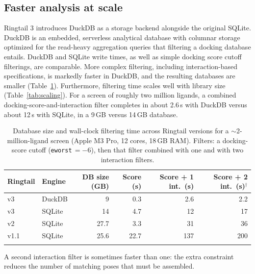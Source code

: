 \documentclass[unnumsec,webpdf,contemporary,large]{oup-authoring-template}
\begin{document}
\subsection{Faster analysis at scale}
Ringtail 3 introduces DuckDB as a storage backend alongside the original SQLite. DuckDB is an embedded, serverless analytical database with columnar storage optimized for the read-heavy aggregation queries that filtering a docking database entails. DuckDB and SQLite write times, as well as simple docking score cutoff filterings, are comparable. More complex filtering, including interaction-based specifications, is markedly faster in DuckDB, and the resulting databases are smaller (Table~\ref{tab:versions}). Furthermore, filtering time scales well with library size (Table~\ref{tab:scaling}). For a screen of roughly two million ligands, a combined docking-score-and-interaction filter completes in about 2.6\,s with DuckDB versus about 12\,s with SQLite, in a 9\,GB versus 14\,GB database.
\begin{table}[t]
\caption{Database size and wall-clock filtering time across Ringtail versions for a $\sim$2-million-ligand screen (Apple M3 Pro, 12 cores, 18\,GB RAM). Filters: a docking-score cutoff (\texttt{eworst}\,$=-6$), then that filter combined with one and with two interaction filters.}
\label{tab:versions}
\centering
\begin{tabular}{@{}llrrrr@{}}
\toprule
Ringtail & Engine & DB size (GB) & Score (s) & Score + 1 int.\ (s) & Score + 2 int.\ (s)$^{\dagger}$ \\
\midrule
v3   & DuckDB & 9    & 0.3  & 2.6 & 2.2 \\
v3   & SQLite & 14   & 4.7  & 12  & 17  \\
v2   & SQLite & 27.7 & 3.3  & 31  & 36  \\
v1.1 & SQLite & 25.6 & 22.7 & 137 & 200 \\
\botrule
\end{tabular}
\begin{tablenotes}
\item[$\dagger$] A second interaction filter is sometimes faster than one: the extra constraint reduces the number of matching poses that must be assembled.
\end{tablenotes}
\end{table}
\end{document}
